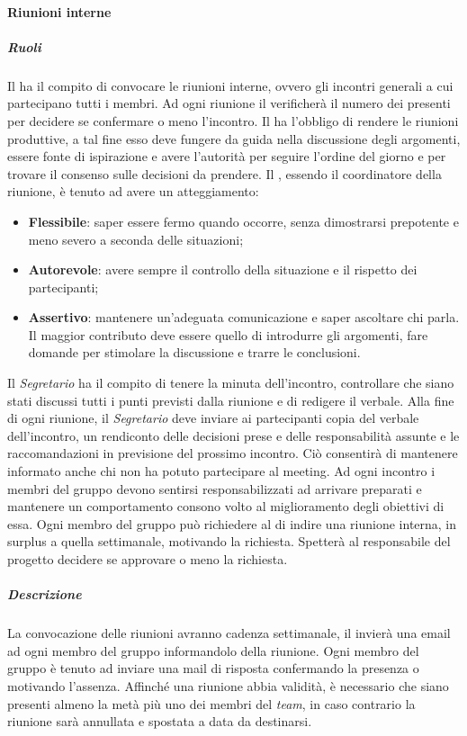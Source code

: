 \paragraph{Riunioni interne}
\subparagraph{Ruoli}
Il \textsl{\RdP} ha il compito di convocare le riunioni interne, ovvero gli incontri generali a cui partecipano tutti i membri.
Ad ogni riunione il \textsl{\RdP} verificherà il numero dei presenti per decidere se confermare o meno l'incontro.
Il \textsl{\RdP} ha l'obbligo di rendere le riunioni produttive, a tal fine
esso deve fungere da guida nella discussione degli argomenti, essere fonte di ispirazione e avere l'autorità per seguire l'ordine del giorno e per trovare il consenso sulle decisioni da prendere.
Il \textsl{\RdP}, essendo il coordinatore della riunione, è tenuto ad avere un atteggiamento:
\begin{itemize}
\item
\textbf{Flessibile}: saper essere fermo quando occorre, senza dimostrarsi prepotente e meno severo a seconda delle situazioni;
\item
\textbf{Autorevole}: avere sempre il controllo della situazione e il rispetto dei partecipanti;
\item
\textbf{Assertivo}: mantenere un'adeguata comunicazione e saper ascoltare chi parla. Il maggior contributo deve essere quello di introdurre gli argomenti, fare domande per stimolare la discussione e trarre le conclusioni.
\end{itemize}
Il \textit{Segretario} ha il compito di tenere la minuta dell'incontro, controllare che siano stati discussi tutti i punti previsti dalla riunione e di redigere
il verbale. Alla fine di ogni riunione, il \textit{Segretario} deve inviare ai partecipanti copia del verbale dell'incontro, un rendiconto delle decisioni prese e delle responsabilità assunte e le raccomandazioni in previsione del prossimo incontro. Ciò consentirà di mantenere informato anche chi non ha potuto partecipare al meeting.
Ad ogni incontro i membri del gruppo devono sentirsi responsabilizzati ad arrivare preparati e mantenere un comportamento consono volto al miglioramento degli obiettivi di essa.
Ogni membro del gruppo può richiedere al \textit{\RdP} di indire una riunione interna, in surplus a quella settimanale, motivando la richiesta. Spetterà al responsabile del progetto decidere se approvare o meno la richiesta.
\subparagraph{Descrizione}
La convocazione delle riunioni avranno cadenza settimanale, il \textit{\RdP} invierà una email ad ogni membro del gruppo informandolo della riunione.
Ogni membro del gruppo è tenuto ad inviare una mail di risposta confermando la presenza o motivando l'assenza.
Affinché una riunione abbia validità, è necessario che siano presenti almeno la metà più uno dei membri del \textit{team}, in caso contrario la riunione sarà annullata e spostata a data da destinarsi.

